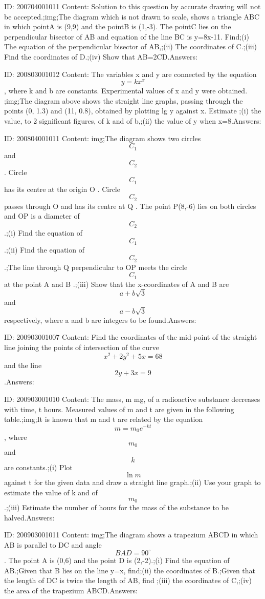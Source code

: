 \documentclass{article}
\begin{document}
ID: 200704001011
Content:
Solution to this question by accurate drawing will not be accepted.;img;The diagram which is not drawn to scale, shows a triangle ABC in which pointA is (9,9) and the pointB is (1,-3). The pointC lies on the perpendicular bisector of AB and equation of the line BC is y=8x-11. Find;(i) The equation of the perpendicular bisector of AB,;(ii) The coordinates of C.;(iii) Find the coordinates of D.;(iv) Show that AB=2CD.Answers:

ID: 200803001012
Content:
The variables x and y are connected by the equation $$y = kx^x$$, where k and b are constants. Experimental values of x and y were obtained. ;img;The diagram above shows the straight line graphs, passing through the points (0, 1.3) and (11, 0.8), obtained by plotting lg y against x. Estimate ;(i) the value, to 2 significant figures, of k and of b,;(ii) the value of y when x=8.Answers:

ID: 200804001011
Content:
img;The diagram shows two circles  $$C_1$$  and  $$C_2$$ . Circle  $$C_1$$  has its centre at the origin  O . Circle  $$C_2$$  passes through  O  and has its centre at  Q . The point P(8,-6) lies on both circles and  OP  is a diameter of  $$C_2$$ .;(i) Find the equation of  $$C_1$$ .;(ii) Find the equation of  $$C_2$$ .;The line through  Q  perpendicular to  OP  meets the circle  $$C_1$$  at the point  A  and  B .;(iii) Show that the x-coordinates of  A  and  B  are  $$a + b \sqrt3$$  and  $$a - b \sqrt3$$  respectively, where  a  and  b  are integers to be found.Answers:

ID: 200903001007
Content:
Find the coordinates of the mid-point of the straight line joining the points of intersection of the curve $$x^2 +2y^2 + 5x =68$$ and the line $$2y+3x=9$$.Answers:

ID: 200903001010
Content:
The mass,  m mg, of a radioactive substance decreases with time, t hours. Measured values of m and t are given in the following table.;img;It is known that m and t are related by the equation $$m = m_0 e^{-kt}$$, where $$m_0$$ and $$k$$ are constants.;(i)	Plot $$\ln m$$ against t for the given data and draw a straight line graph.;(ii)	Use your graph to estimate the value of k and of $$m_0$$.;(iii)	Estimate the number of hours for the mass of the substance to be halved.Answers:

ID: 200903001011
Content:
img;The diagram shows a trapezium ABCD in which AB is parallel to DC and angle $$BAD=90^{\circ}$$. The point A is (0,6) and the point D is (2,-2).;(i) Find the equation of AB.;Given that B lies on the line y=x, find;(ii) the coordinates of B.;Given that the length of DC is twice the length of AB, find ;(iii) the coordinates of C,;(iv) the area of the trapezium ABCD.Answers:
\end{document}
